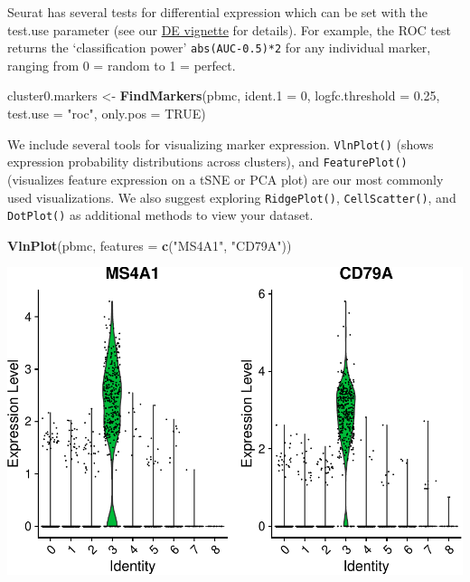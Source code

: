 \documentclass[
]{book}
\newenvironment{Shaded}{\begin{snugshade}}{\end{snugshade}}
\newcommand{\AttributeTok}[1]{\textcolor[rgb]{0.13,0.29,0.53}{#1}}
\newcommand{\ConstantTok}[1]{\textcolor[rgb]{0.56,0.35,0.01}{#1}}
\newcommand{\DecValTok}[1]{\textcolor[rgb]{0.00,0.00,0.81}{#1}}
\newcommand{\FloatTok}[1]{\textcolor[rgb]{0.00,0.00,0.81}{#1}}
\newcommand{\FunctionTok}[1]{\textcolor[rgb]{0.13,0.29,0.53}{\textbf{#1}}}
\newcommand{\NormalTok}[1]{#1}
\newcommand{\OtherTok}[1]{\textcolor[rgb]{0.56,0.35,0.01}{#1}}
\newcommand{\StringTok}[1]{\textcolor[rgb]{0.31,0.60,0.02}{#1}}
\begin{document}
Seurat has several tests for differential expression which can be set with the test.use parameter (see our \href{de_vignette.html}{DE vignette} for details). For example, the ROC test returns the `classification power' \texttt{abs(AUC-0.5)*2} for any individual marker, ranging from 0 = random to 1 = perfect.

\begin{Shaded}
\begin{Highlighting}[]
\NormalTok{cluster0.markers }\OtherTok{\textless{}{-}} \FunctionTok{FindMarkers}\NormalTok{(pbmc, }\AttributeTok{ident.1 =} \DecValTok{0}\NormalTok{, }\AttributeTok{logfc.threshold =} \FloatTok{0.25}\NormalTok{, }\AttributeTok{test.use =} \StringTok{"roc"}\NormalTok{, }\AttributeTok{only.pos =} \ConstantTok{TRUE}\NormalTok{)}
\end{Highlighting}
\end{Shaded}

We include several tools for visualizing marker expression. \texttt{VlnPlot()} (shows expression probability distributions across clusters), and \texttt{FeaturePlot()} (visualizes feature expression on a tSNE or PCA plot) are our most commonly used visualizations. We also suggest exploring \texttt{RidgePlot()}, \texttt{CellScatter()}, and \texttt{DotPlot()} as additional methods to view your dataset.

\begin{Shaded}
\begin{Highlighting}[]
\FunctionTok{VlnPlot}\NormalTok{(pbmc, }\AttributeTok{features =} \FunctionTok{c}\NormalTok{(}\StringTok{"MS4A1"}\NormalTok{, }\StringTok{"CD79A"}\NormalTok{))}
\end{Highlighting}
\end{Shaded}

\includegraphics{scRNAseqInR_Doco_files/figure-latex/unnamed-chunk-29-1.pdf}
\end{document}
